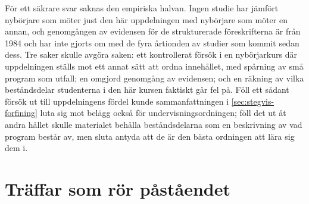 För ett säkrare svar saknas den empiriska halvan.  Ingen studie har
jämfört nybörjare som möter just den här uppdelningen med nybörjare som
möter en annan, och genomgången av evidensen för de strukturerade
föreskrifterna är från 1984 och har inte gjorts om med de fyra
årtionden av studier som kommit sedan dess.  Tre saker skulle avgöra
saken: ett kontrollerat försök i en nybörjarkurs där uppdelningen ställs
mot ett annat sätt att ordna innehållet, med spårning av små program som
utfall; en omgjord genomgång av evidensen; och en räkning av vilka
beståndsdelar studenterna i den här kursen faktiskt går fel på.  Föll
ett sådant försök ut till uppdelningens fördel kunde sammanfattningen i
\cref{sec:stegvis-forfining} luta sig mot belägg också för
undervisningsordningen; föll det ut åt andra hållet skulle materialet
behålla beståndsdelarna som en beskrivning av vad program består av, men
sluta antyda att de är den bästa ordningen att lära sig dem i.

\section{Träffar som rör påståendet}
\label{sec:fulltrafflistor}

